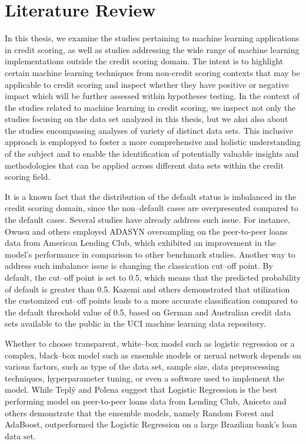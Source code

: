 \chapter{Literature Review}
\label{chap:three}

In this thesis, we examine the studies pertaining to machine learning applications in credit scoring, as well as studies addressing the wide range of machine learning implementations outside the credit scoring domain. The intent is to highlight certain machine learning techniques from non-credit scoring contexts that may be applicable to credit scoring and inspect whether they have positive or negative impact which will be further assessed within hypotheses testing.
In the context of the studies related to machine learning in credit scoring, we inspect not only the studies focusing on the data set analyzed in this thesis, but we aksi  also about the studies encompassing analyses of variety of distinct data sets.
This inclusive approach is emplopyed to foster a more comprehensive and holistic understanding of the subject and to enable the identification of potentially valuable insights and methodologies that can be applied across different data sets within the credit scoring field.

It is a known fact that the distribution of the default status is imbalanced in the credit scoring domain, since the non--default cases are overpresented compared to the default cases. Several studies have already address such issue.
For instance, Owusu and others \citep{owusu2023deep} employed ADASYN oversampling on the peer-to-peer loans data from American Lending Club, which exhibited an improvement in the model's performance in comparison to other benchmark studies.
Another way to address such imbalance issue is changing the classication cut--off point.
By default, the cut--off point is set to 0.5, which means that the predicted probability of default is greater than 0.5. Kazemi and others \citep{kazemi2023estimation} demonstrated that utilization the customized cut--off points leads to a more accurate classification compared to the default threshold value of 0.5, based on German and Australian credit data sets available to the public in the UCI machine learning data repository.


Whether to choose transparent, white--box model such as logistic regression or a complex, black--box model such as ensemble models or nerual network depends on various factors, such as type of the data set, sample size, data preprocessing techniques, hyperparameter tuning, or even a software used to implement the model.
While Tepl\'{y} and Polena \citep{teply2020best} suggest that Logistic Regression is the best performing model on peer-to-peer loans data from Lending Club, Aniceto and others \citep{aniceto2020machine} demonstrate that the ensemble models, namely Random Forest and AdaBoost, outperformed the Logistic Regression on a large Brazilian bank's loan data set.



